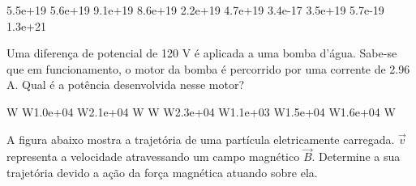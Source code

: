 \documentclass[12pt, addpoints]{exam}
\begin{document}
\begin{questions}
\begin{multicols*}{2}
\begin{oneparchoices}
\choice 5.5e+19 \choice 5.6e+19 \choice 9.1e+19 \choice 8.6e+19 \choice 2.2e+19 \choice 4.7e+19 \choice 3.4e-17 \choice 3.5e+19 \choice 5.7e-19 \choice 1.3e+21 
\end{oneparchoices}\question Uma diferença de potencial de 120 V é aplicada a uma bomba d’água. Sabe-se que em funcionamento, o motor da bomba é percorrido por uma corrente de    2.96 A. Qual é a potência desenvolvida nesse motor?

\begin{oneparchoices}
 W W\choice 1.0e+04 W\choice 2.1e+04 W W W\choice 2.3e+04 W\choice 1.1e+03 W\choice 1.5e+04 W\choice 1.6e+04 W
\end{oneparchoices}\question A ﬁgura abaixo mostra a trajetória de uma partícula eletricamente carregada. $\vec{{v}}$ representa a velocidade atravessando um campo magnético $\vec{{B}}$. Determine a sua trajetória devido a ação da força magnética atuando sobre ela.
        
        \begin{center}
            \begin{minipage}[c]{0.5\linewidth}
            \end{minipage}
        \end{center}

        


\end{multicols*}
\end{questions}
\end{document}
